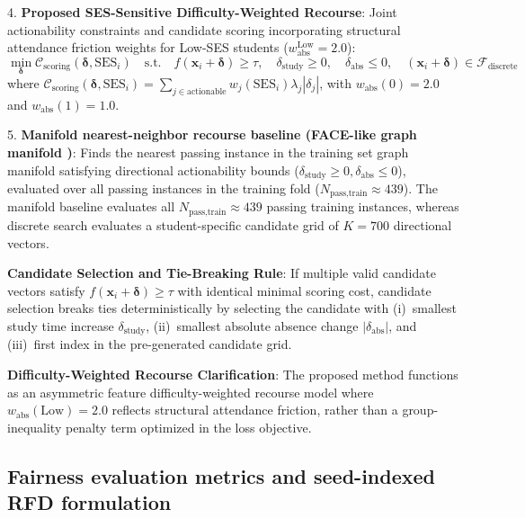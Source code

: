 \documentclass[11pt]{article}
\begin{document}
4. \textbf{Proposed SES-Sensitive Difficulty-Weighted Recourse}:
Joint actionability constraints and candidate scoring incorporating structural attendance friction weights for Low-SES students ($w_{\text{abs}}^{\text{Low}}=2.0$):
\begin{equation}
\min_{\boldsymbol{\delta}} \mathcal{C}_{\text{scoring}}(\boldsymbol{\delta}, \text{SES}_i) \quad \text{s.t.} \quad f(\mathbf{x}_i + \boldsymbol{\delta}) \ge \tau, \quad \delta_{\text{study}} \ge 0, \quad \delta_{\text{abs}} \le 0, \quad (\mathbf{x}_i + \boldsymbol{\delta}) \in \mathcal{F}_{\text{discrete}}
\end{equation}
where $\mathcal{C}_{\text{scoring}}(\boldsymbol{\delta}, \text{SES}_i) = \sum_{j \in \text{actionable}} w_j(\text{SES}_i) \lambda_j |\delta_j|$, with $w_{\text{abs}}(0) = 2.0$ and $w_{\text{abs}}(1) = 1.0$.

5. \textbf{Manifold nearest-neighbor recourse baseline (FACE-like graph manifold \cite{Poyiadzi2020})}:
Finds the nearest passing instance in the training set graph manifold satisfying directional actionability bounds ($\delta_{\text{study}} \ge 0, \delta_{\text{abs}} \le 0$), evaluated over all passing instances in the training fold ($N_{\text{pass,train}} \approx 439$). The manifold baseline evaluates all $N_{\text{pass,train}} \approx 439$ passing training instances, whereas discrete search evaluates a student-specific candidate grid of $K=700$ directional vectors.

\textbf{Candidate Selection and Tie-Breaking Rule}: If multiple valid candidate vectors satisfy $f(\mathbf{x}_i + \boldsymbol{\delta}) \ge \tau$ with identical minimal scoring cost, candidate selection breaks ties deterministically by selecting the candidate with (i)~smallest study time increase $\delta_{\text{study}}$, (ii)~smallest absolute absence change $|\delta_{\text{abs}}|$, and (iii)~first index in the pre-generated candidate grid.

\textbf{Difficulty-Weighted Recourse Clarification}: The proposed method functions as an asymmetric feature difficulty-weighted recourse model where $w_{\text{abs}}(\text{Low})=2.0$ reflects structural attendance friction, rather than a group-inequality penalty term optimized in the loss objective.

\subsection{Fairness evaluation metrics and seed-indexed RFD formulation}
\label{subsec:metrics}
\end{document}
